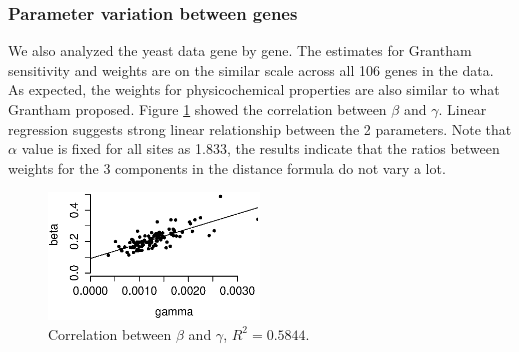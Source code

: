 \subsubsection{Parameter variation between genes}
We also analyzed the yeast data gene by gene.
The estimates for Grantham sensitivity and weights are on the similar scale across all 106 genes in the data.
As expected, the weights for physicochemical properties are also similar to what Grantham proposed.
Figure \ref{fig:correlation} showed the correlation between $\beta$ and $\gamma$.
Linear regression suggests strong linear relationship between the 2 parameters.
Note that $\alpha$ value is fixed for all sites as 1.833, the results indicate that the ratios between weights for the 3 components in the distance formula do not vary a lot.\\

\begin{figure}[h]
\centering
\includegraphics[width=0.5\textwidth]{GMcorr.eps}
\caption{Correlation between $\beta$ and $\gamma$, $R^2 = 0.5844.$}
\label{fig:correlation}
\end{figure}



